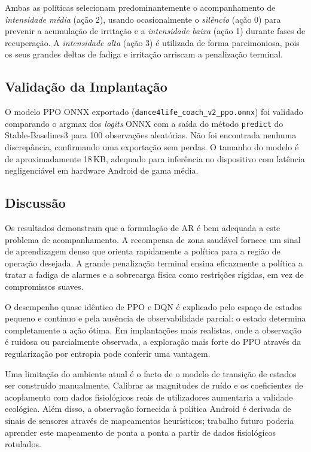 \documentclass[runningheads]{llncs}
\begin{document}
Ambas as políticas selecionam predominantemente o acompanhamento de
\emph{intensidade média} (ação 2), usando ocasionalmente o \emph{silêncio}
(ação 0) para prevenir a acumulação de irritação e a \emph{intensidade baixa}
(ação 1) durante fases de recuperação. A \emph{intensidade alta} (ação 3) é
utilizada de forma parcimoniosa, pois os seus grandes deltas de fadiga e irritação
arriscam a penalização terminal.

\subsection{Validação da Implantação}

O modelo PPO ONNX exportado (\texttt{dance4life\_coach\_v2\_ppo.onnx}) foi validado
comparando o argmax dos \emph{logits} ONNX com a saída do método \texttt{predict}
do Stable-Baselines3 para 100 observações aleatórias. Não foi encontrada nenhuma
discrepância, confirmando uma exportação sem perdas. O tamanho do modelo é de
aproximadamente 18\,KB, adequado para inferência no dispositivo com latência
negligenciável em hardware Android de gama média.

\subsection{Discussão}

Os resultados demonstram que a formulação de AR é bem adequada a este problema de
acompanhamento. A recompensa de zona saudável fornece um sinal de aprendizagem
denso que orienta rapidamente a política para a região de operação desejada. A
grande penalização terminal ensina eficazmente a política a tratar a fadiga de
alarmes e a sobrecarga física como restrições rígidas, em vez de compromissos
suaves.

O desempenho quase idêntico de PPO e DQN é explicado pelo espaço de estados
pequeno e contínuo e pela ausência de observabilidade parcial: o estado determina
completamente a ação ótima. Em implantações mais realistas, onde a observação é
ruidosa ou parcialmente observada, a exploração mais forte do PPO através da
regularização por entropia pode conferir uma vantagem.

Uma limitação do ambiente atual é o facto de o modelo de transição de estados ser
construído manualmente. Calibrar as magnitudes de ruído e os coeficientes de
acoplamento com dados fisiológicos reais de utilizadores aumentaria a validade
ecológica. Além disso, a observação fornecida à política Android é derivada de
sinais de sensores através de mapeamentos heurísticos; trabalho futuro poderia
aprender este mapeamento de ponta a ponta a partir de dados fisiológicos rotulados.
\end{document}
